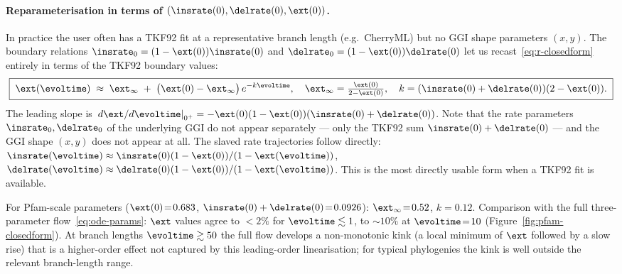 \paragraph{Reparameterisation in terms of $(\insrate(0),\delrate(0),\fragext(0))$.}
In practice the user often has a TKF92 fit at a representative branch length
(e.g.\ CherryML) but no GGI shape parameters $(x, y)$.  The boundary relations
$\insrate_0=(1-\fragext(0))\insrate(0)$ and $\delrate_0=(1-\fragext(0))\delrate(0)$
let us recast~\eqref{eq:r-closedform} entirely in terms of the TKF92
boundary values:
\begin{equation}
\label{eq:r-closedform-tkf}
\boxed{\;
\fragext(\evoltime) \;\approx\; \fragext_\infty
\;+\; \bigl(\fragext(0)-\fragext_\infty\bigr)\,e^{-k\evoltime},\quad
\fragext_\infty = \tfrac{\fragext(0)}{2-\fragext(0)},\quad
k = (\insrate(0)+\delrate(0))(2-\fragext(0)).\;}
\end{equation}
The leading slope is
$\left.d\fragext/d\evoltime\right|_{0^+} = -\fragext(0)(1-\fragext(0))(\insrate(0)+\delrate(0))$.
Note that the rate parameters $\insrate_0,\delrate_0$ of the underlying GGI
do not appear separately --- only the TKF92 sum $\insrate(0)+\delrate(0)$
--- and the GGI shape $(x,y)$ does not appear at all.  The slaved rate
trajectories follow directly:
$\insrate(\evoltime) \approx \insrate(0)(1-\fragext(0))/(1-\fragext(\evoltime))$,
$\delrate(\evoltime) \approx \delrate(0)(1-\fragext(0))/(1-\fragext(\evoltime))$.
This is the most directly usable form when a TKF92 fit is available.

For Pfam-scale parameters
($\fragext(0)\!=\!0.683$, $\insrate(0)+\delrate(0)\!=\!0.0926$):
$\fragext_\infty\!=\!0.52$, $k\!=\!0.12$.  Comparison with the full
three-parameter flow~\eqref{eq:ode-params}: $\fragext$ values agree to
$<\!2\%$ for $\evoltime\lesssim 1$, to $\sim\!10\%$ at $\evoltime\!=\!10$
(Figure~\ref{fig:pfam-closedform}).  At branch lengths $\evoltime\gtrsim 50$
the full flow develops a non-monotonic kink (a local minimum of $\fragext$
followed by a slow rise) that is a higher-order effect not captured by
this leading-order linearisation; for typical phylogenies the kink is well
outside the relevant branch-length range.

